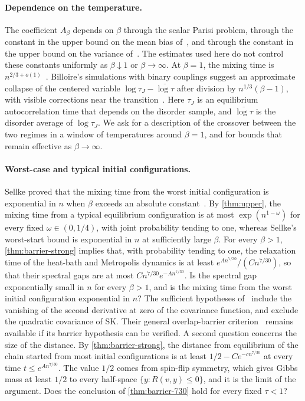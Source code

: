 \paragraph{Dependence on the temperature.}
The coefficient $A_\beta$ depends on $\beta$ through the scalar Parisi
problem, through the constant in the upper bound on the mean bias
of~\cite{hexagon-bias}, and through the constant in the upper bound on the
variance of~\cite{quantitative-parisi}. The estimates used here do not control
these constants uniformly as $\beta\downarrow1$ or $\beta\to\infty$.
At $\beta=1$, the mixing time is
$n^{2/3+o(1)}$~\cite[Theorem~1.1]{oai-critical-mixing}. Billoire's
simulations with binary couplings suggest an approximate collapse of the
centered variable $\log\tau_J-\overline{\log\tau}$ after division by
$n^{1/3}(\beta-1)$, with visible corrections near the
transition~\cite[equation~(6), Figure~3 and the following discussion]{billoire-2010}.
Here $\tau_J$ is an equilibrium autocorrelation time that depends on the
disorder sample, and $\overline{\log\tau}$ is the disorder average of
$\log\tau_J$.
We ask for a description of the crossover between the two regimes in a window
of temperatures around $\beta=1$, and for bounds that remain effective as
$\beta\to\infty$.

\paragraph{Worst-case and typical initial configurations.}
Sellke proved that the mixing time from the worst initial configuration is
exponential in $n$ when $\beta$ exceeds an absolute
constant~\cite[Theorem~1.1]{sellke-2025}. By \cref{thm:upper}, the mixing
time from a typical equilibrium configuration is at most
$\exp(n^{1-\omega})$ for every fixed $\omega\in(0,1/4)$, with joint
probability tending to one, whereas Sellke's worst-start bound is
exponential in $n$ at sufficiently large $\beta$. For every $\beta>1$,
\cref{thm:barrier-strong} implies that, with probability tending to one, the
relaxation time of the heat-bath and Metropolis dynamics is at least
$e^{An^{7/30}}/(Cn^{7/30})$, so that their spectral gaps are at most
$Cn^{7/30}e^{-An^{7/30}}$. Is the spectral gap exponentially small in $n$ for
every $\beta>1$, and is the mixing time from the worst initial configuration
exponential in $n$? The sufficient hypotheses
of~\cite[Theorem~1.9]{ben-arous-jagannath-2018} include the vanishing of the
second derivative at zero of the covariance function, and exclude
the quadratic covariance of SK. Their general overlap-barrier
criterion~\cite[Theorem~1.3]{ben-arous-jagannath-2018} remains available if
its barrier hypothesis can be verified. A second question concerns the size
of the distance. By \cref{thm:barrier-strong}, the distance from equilibrium
of the chain started from most initial configurations is at least
$1/2-Ce^{-cn^{7/30}}$ at every time $t\le e^{An^{7/30}}$. The value $1/2$
comes from spin-flip symmetry, which gives Gibbs mass at least $1/2$ to every
half-space $\{y:R(v,y)\le0\}$, and it is the limit of the argument. Does the
conclusion of \cref{thm:barrier-730} hold for every fixed $\tau<1$?

